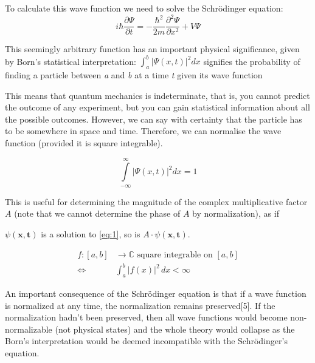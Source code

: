 \documentclass{article}
\begin{document}
To calculate this wave function we need to solve the Schr\"{o}dinger equation:
\begin{equation}
i\hbar \frac{\partial \Psi}{\partial t} = -\frac{\hbar^2}{2m}
\frac{\partial^2 \Psi}{\partial x^2} + V \Psi
\label{eq:1}
\end{equation}

This seemingly arbitrary function has an important physical significance, given by Born's statistical interpretation: $\int_a^b |\Psi(x,t)|^2 dx$ signifies the probability of finding a particle between \textit{a} and \textit{b} at a time \textit{t} given its wave function


This means that quantum mechanics is indeterminate, that is, you cannot predict the outcome of any experiment, but you can gain statistical information about all the possible outcomes. However, we can say with certainty that the particle has to be somewhere in space and time. Therefore, we can normalise the wave function (provided it is square integrable).

\begin{equation}
\int\limits_{-\infty}^\infty |\Psi(x,t)|^2 dx = 1
\label{eq:2}
\end{equation}

This is useful for determining the magnitude of the complex multiplicative factor $A$ (note that we cannot determine the phase of $A$ by normalization), as if 

$\psi(\mathbf{x},\mathbf{t})$ is a solution to \eqref{eq:1}, so is $A\cdot\psi(\mathbf{x},\mathbf{t})$. 






\begin{align}
f:[a,b] &\to \mathbb{C} \text{ square integrable on } [a,b] \nonumber \\
\iff \quad &\int_{a}^{b} |f(x)|^{2} \, dx < \infty
\label{eq:3}
\end{align}



An important consequence of the Schrödinger equation is that if a wave function is normalized at any time, the normalization remains preserved[5].  If the normalization hadn't been preserved, then all wave functions would become non-normalizable (not physical states) and the whole theory would collapse as the Born's interpretation would be deemed incompatible with the Schr\"{o}dinger's equation.
\end{document}
